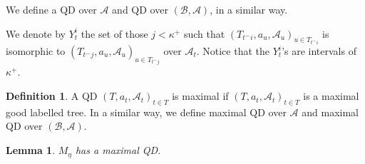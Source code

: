 \documentclass[12pt,a4paper]{amsart}
\newtheorem{lemma}[thm]{Lemma}
\theoremstyle{definition}
\newtheorem{defn}[thm]{Definition}
\theoremstyle{remark}
\renewcommand{\mid}{\mathrel{|}\allowbreak}
\begin{document}
We define a QD over $\mathcal{A}$ and QD over $(\mathcal{B},\mathcal{A})$, in a similar way.

We  denote by $Y^i_t$ the set of those $j<\kappa^+$ such that $(T_{t^\frown i}, a_u, \mathcal{A}_u)_{u\in T_{t^\frown i}}$ is isomorphic to $(T_{t^\frown j}, a_u, \mathcal{A}_u)_{u\in T_{t^\frown j}}$ over $\mathcal{A}_t$. %
Notice that the $Y^i_t$'s are intervals of $\kappa^+$.

\begin{defn}
    A QD $(T, a_t, \mathcal{A}_t)_{t\in T}$ is maximal if $(T, a_t, \mathcal{A}_t)_{t\in T}$ is a maximal good labelled tree. In a similar way, we define maximal QD over $\mathcal{A}$ and maximal QD over $(\mathcal{B},\mathcal{A})$.
\end{defn}

\begin{lemma}\label{5.12}
    $M_\eta$ has a maximal  QD.%
\end{lemma}
\end{document}
